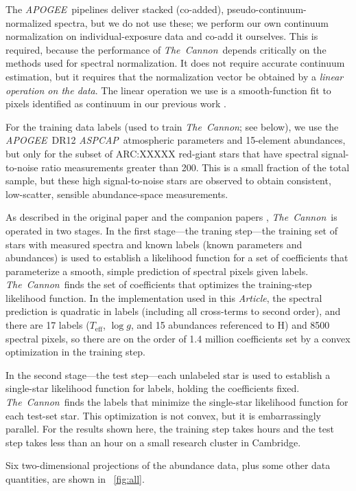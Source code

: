 \documentclass[12pt, letterpaper, preprint]{aastex}
\newcommand{\acronym}[1]{{\small{#1}}}
\newcommand{\project}[1]{\textsl{#1}}
\newcommand{\apogee}{\project{\acronym{APOGEE}}}
\newcommand{\aspcap}{\project{\acronym{ASPCAP}}}
\newcommand{\thecannon}{\project{The~Cannon}}
\newcommand{\documentname}{\textsl{Article}}
\newcommand{\teff}{T_{\mathrm{eff}}}
\newcommand{\logg}{\log g}
\begin{document}
The \apogee\ pipelines deliver stacked (co-added),
pseudo-continuum-normalized spectra, but we do not use these; we
perform our own continuum normalization on individual-exposure data
and co-add it ourselves.
This is required, because the performance of \thecannon\ depends
critically on the methods used for spectral normalization.  It does
not require accurate continuum estimation, but it requires that the
normalization vector be obtained by a \emph{linear operation on the
  data}.
The linear operation we use is a smooth-function fit to pixels
identified as continuum in our previous work \citep{thecannon}.

For the training data labels (used to train \thecannon; see below), we
use the \apogee\ \acronym{DR12} \aspcap\ atmospheric parameters and
15-element abundances, but only for the subset of ARC:XXXXX red-giant
stars that have spectral signal-to-noise ratio measurements greater
than 200.
This is a small fraction of the total sample, but these high
signal-to-noise stars are observed to obtain consistent, low-scatter,
sensible abundance-space measurements.

As described in the original paper \citep{thecannon} and the companion
papers \citep{casey16, ness16}, \thecannon\ is operated in two stages.
In the first stage---the traning step---the training set of stars with
measured spectra and known labels (known parameters and abundances) is
used to establish a likelihood function for a set of coefficients that
parameterize a smooth, simple prediction of spectral pixels given
labels.
\thecannon\ finds the set of coefficients that optimizes the
training-step likelihood function.
In the implementation used in this \documentname, the spectral
prediction is quadratic in labels (including all cross-terms to second
order), and there are 17 labels ($\teff$, $\logg$, and 15 abundances
referenced to H) and 8500 spectral pixels, so there are on the order
of 1.4 million coefficients set by a convex optimization in the
training step.

In the second stage---the test step---each unlabeled star is used to
establish a single-star likelihood function for labels, holding the
coefficients fixed.
\thecannon\ finds the labels that minimize the single-star likelihood
function for each test-set star.
This optimization is not convex, but it is embarrassingly parallel.
For the results shown here, the training step takes hours and the test
step takes less than an hour on a small research cluster in Cambridge.

Six two-dimensional projections of the abundance data, plus some other
data quantities, are shown in \figurename~\ref{fig:all}.
\end{document}

